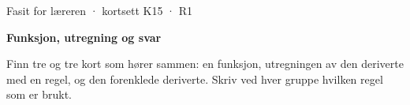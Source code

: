 \documentclass[11pt,a4paper]{article}
\begin{document}
\begin{minipage}[t]{0.8\linewidth}\vspace{0pt}
{\sffamily\small\color{dempet}Fasit for læreren · kortsett K15 · R1}\par\vspace{0.25em}
{\fontsize{20}{24}\selectfont\bfseries Funksjon, utregning og svar}\par\vspace{0.5em}
Finn tre og tre kort som hører sammen: en funksjon, utregningen av den deriverte med en regel, og den forenklede deriverte. Skriv ved hver gruppe hvilken regel som er brukt.\par{}
\end{minipage}\hfill
\begin{minipage}[t]{0.15\linewidth}\vspace{0pt}\raggedleft
{}
\end{minipage}\par\vspace{0.8em}
\end{document}

